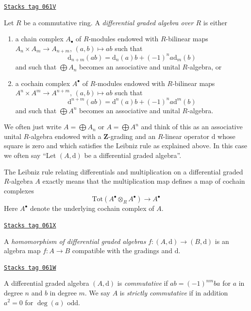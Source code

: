 \begin{definition}[Dga]
\label{dga-definition-dga}
\href{https://stacks.math.columbia.edu/tag/061V}{\texttt{Stacks tag 061V}}

Let $R$ be a commutative ring. A {\it differential graded algebra over $R$}
is either
\begin{enumerate}
\item a chain complex $A_\bullet$ of $R$-modules endowed with
$R$-bilinear maps $A_n \times A_m \to A_{n + m}$,
$(a, b) \mapsto ab$ such that
$$
\text{d}_{n + m}(ab) = \text{d}_n(a)b + (-1)^n a\text{d}_m(b)
$$
and such that $\bigoplus A_n$ becomes an associative and unital
$R$-algebra, or
\item a cochain complex $A^\bullet$ of $R$-modules endowed with
$R$-bilinear maps $A^n \times A^m \to A^{n + m}$, $(a, b) \mapsto ab$
such that
$$
\text{d}^{n + m}(ab) = \text{d}^n(a)b + (-1)^n a\text{d}^m(b)
$$
and such that $\bigoplus A^n$ becomes an associative and unital $R$-algebra.
\end{enumerate}
\end{definition}

We often just write $A = \bigoplus A_n$ or $A = \bigoplus A^n$ and
think of this as an associative unital $R$-algebra endowed with a
$\mathbf{Z}$-grading and an $R$-linear operator $\text{d}$ whose square
is zero and which satisfies the Leibniz rule as explained above. In this case
we often say ``Let $(A, \text{d})$ be a differential graded algebra''.

\medskip\noindent
The Leibniz rule relating differentials and multiplication on a differential
graded $R$-algebra $A$ exactly means that the multiplication map defines
a map of cochain complexes
$$
\text{Tot}(A^\bullet \otimes_R A^\bullet) \to A^\bullet
$$
Here $A^\bullet$ denote the underlying cochain complex of $A$.

\begin{definition}
\label{dga-definition-homomorphism-dga}
\href{https://stacks.math.columbia.edu/tag/061X}{\texttt{Stacks tag 061X}}

A {\it homomorphism of differential graded algebras}
$f : (A, \text{d}) \to (B, \text{d})$ is an algebra map $f : A \to B$
compatible with the gradings and $\text{d}$.
\end{definition}

\begin{definition}[Cdga]
\label{dga-definition-cdga}
\href{https://stacks.math.columbia.edu/tag/061W}{\texttt{Stacks tag 061W}}

A differential graded algebra $(A, \text{d})$ is {\it commutative} if
$ab = (-1)^{nm}ba$ for $a$ in degree $n$ and $b$ in degree $m$.
We say $A$ is {\it strictly commutative} if in addition $a^2 = 0$
for $\deg(a)$ odd.
\end{definition}

